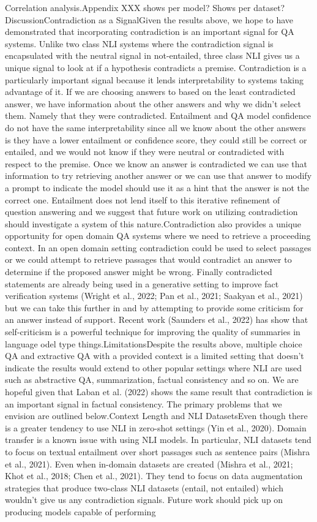\documentclass{scrbook}
\begin{document}
Correlation analysis.Appendix XXX shows per model? Shows per dataset?DiscussionContradiction as a SignalGiven the results above, we hope to have demonstrated that incorporating contradiction is an important signal for QA systems. Unlike two class NLI systems where the contradiction signal is encapsulated with the neutral signal in not-entailed, three class NLI gives us a unique signal to look at if a hypothesis contradicts a premise. Contradiction is a particularly important signal because it lends interpretability to systems taking advantage of it. If we are choosing answers to based on the least contradicted answer, we have information about the other answers and why we didn’t select them. Namely that they were contradicted. Entailment and QA model confidence do not have the same interpretability since all we know about the other answers is they have a lower entailment or confidence score, they could still be correct or entailed, and we would not know if they were neutral or contradicted with respect to the premise. Once we know an answer is contradicted we can use that information to try retrieving another answer or we can use that answer to modify a prompt to indicate the model should use it as a hint that the answer is not the correct one. Entailment does not lend itself to this iterative refinement of question answering and we suggest that future work on utilizing contradiction should investigate a system of this nature.Contradiction also provides a unique opportunity for open domain QA systems where we need to retrieve a proceeding context. In an open domain setting contradiction could be used to select passages or we could attempt to retrieve passages that would contradict an answer to determine if the proposed answer might be wrong. Finally contradicted statements are already being used in a generative setting to improve fact verification systems (Wright et al., 2022; Pan et al., 2021; Saakyan et al., 2021) but we can take this further in and by attempting to provide some criticism for an answer instead of support. Recent work (Saunders et al., 2022) has show that self-criticism is a powerful technique for improving the quality of summaries in language odel type things.LimitationsDespite the results above, multiple choice QA and extractive QA with a provided context is a limited setting that doesn’t indicate the results would extend to other popular settings where NLI are used such as abstractive QA, summarization, factual consistency and so on. We are hopeful given that Laban et al. (2022) shows the same result that contradiction is an important signal in factual consistency. The primary problems that we envision are outlined below.Context Length and NLI DatasetsEven though there is a greater tendency to use NLI in zero-shot settings (Yin et al., 2020). Domain transfer is a known issue with using NLI models. In particular, NLI datasets tend to focus on textual entailment over short passages such as sentence pairs (Mishra et al., 2021). Even when in-domain datasets are created (Mishra et al., 2021; Khot et al., 2018; Chen et al., 2021). They tend to focus on data augmentation strategies that produce two-class NLI datasets (entail, not entailed) which wouldn’t give us any contradiction signals. Future work should pick up on producing models capable of performing 
\end{document}
